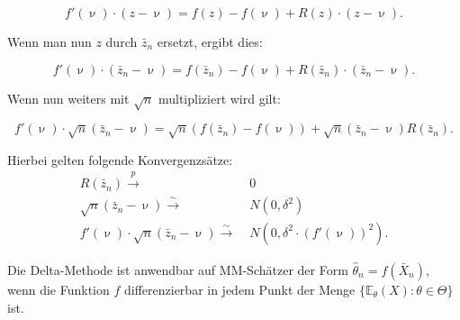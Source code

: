 \documentclass[10pt]{article}
\newcommand{\EW}{\mathbb{E}} %
\newcommand{\KW}{\overset{p} \longrightarrow} %
\newcommand{\KV}{\overset{\sim} \longrightarrow} %
\newenvironment{BWS}[1][]
{\begin{Beweis}[frametitle=#1]}{\end{Beweis}}
\begin{document}
\begin{BWS}[Beweis 1.1 Delta-Methode]
		\begin{equation*}
			f'(\upnu) \cdot (z-\upnu) = f(z) - f(\upnu) + R(z) \cdot (z-\upnu).
		\end{equation*}
		
		Wenn man nun $z$ durch $\bar{z}_n$ ersetzt, ergibt dies:
		
		
		\begin{equation*}
			f'(\upnu) \cdot (\bar{z}_n-\upnu) = f(\bar{z}_n) - f(\upnu) + R(\bar{z}_n) \cdot (\bar{z}_n-\upnu).			
		\end{equation*}
		
		Wenn nun weiters mit $\sqrt{n}$ multipliziert wird gilt:
		
		\begin{equation*}
			f'(\upnu) \cdot\sqrt{n} (\bar{z}_n-\upnu) = \sqrt{n}(f(\bar{z}_n) - f(\upnu)) + \sqrt{n} (\bar{z}_n-\upnu)	R(\bar{z}_n).
		\end{equation*}
		
		Hierbei gelten folgende Konvergenzsätze:
		\begin{equation*}
			\begin{split}
			R(\bar{z}_n) \KW& \;0\\
			\sqrt{n} (\bar{z}_n-\upnu) \KV& \;N(0,\delta^2)\\
			f'(\upnu) \cdot\sqrt{n} (\bar{z}_n-\upnu) \KV& \;N(0,\delta^2 \cdot (f'(\upnu))^2).
			\end{split}
		\end{equation*}
		
		
	\end{BWS}
	
	\noindent Die Delta-Methode ist anwendbar auf MM-Schätzer der Form $\hat{\theta}_n = f(\bar{X}_n)$, wenn die Funktion $f$ differenzierbar in jedem Punkt der Menge $\{\EW_\theta(X) : \theta \in \Theta\}$ ist.
	
	
	
\end{document}
